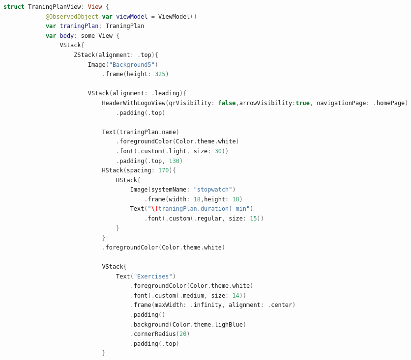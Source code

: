 \begin{spacing}{2}
\end{spacing}
\begin{minipage}{\textwidth}
    \linespread{0.8}\selectfont
    \begin{lstlisting}[language=swift]
        struct TraningPlanView: View {
            @ObservedObject var viewModel = ViewModel()
            var traningPlan: TraningPlan
            var body: some View {
                VStack{
                    ZStack(alignment: .top){
                        Image("Background5")
                            .frame(height: 325)
                            
                        VStack(alignment: .leading){
                            HeaderWithLogoView(qrVisibility: false,arrowVisibility:true, navigationPage: .homePage)
                                .padding(.top)
                            
                            Text(traningPlan.name)
                                .foregroundColor(Color.theme.white)
                                .font(.custom(.light, size: 30))
                                .padding(.top, 130)
                            HStack(spacing: 170){
                                HStack{
                                    Image(systemName: "stopwatch")
                                        .frame(width: 18,height: 18)
                                    Text("\(traningPlan.duration) min")
                                        .font(.custom(.regular, size: 15))
                                }
                            }
                            .foregroundColor(Color.theme.white)
                            
                            VStack{
                                Text("Exercises")
                                    .foregroundColor(Color.theme.white)
                                    .font(.custom(.medium, size: 14))
                                    .frame(maxWidth: .infinity, alignment: .center)
                                    .padding()
                                    .background(Color.theme.lighBlue)
                                    .cornerRadius(20)
                                    .padding(.top)
                            }
                            
    \end{lstlisting}   
\end{minipage}

